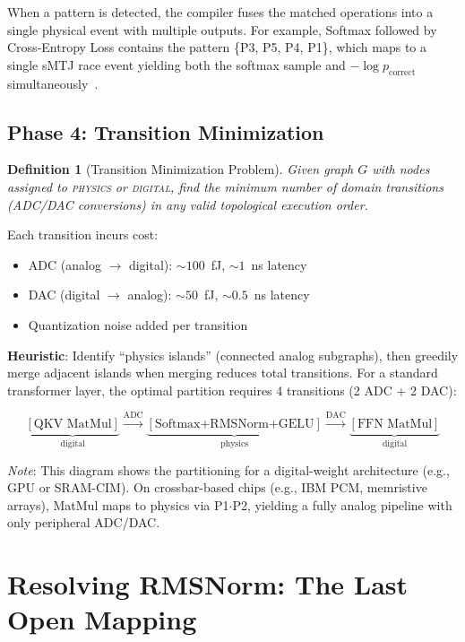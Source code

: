 \documentclass[11pt]{article}
\newtheorem{definition}{Definition}
\begin{document}
When a pattern is detected, the compiler fuses the matched operations into a single physical event with multiple outputs. For example, Softmax followed by Cross-Entropy Loss contains the pattern \{P3, P5, P4, P1\}, which maps to a single sMTJ race event yielding both the softmax sample and $-\log p_{\text{correct}}$ simultaneously~\cite{bieg2026}.

\subsection{Phase 4: Transition Minimization}

\begin{definition}[Transition Minimization Problem]
Given graph $G$ with nodes assigned to \textsc{physics} or \textsc{digital}, find the minimum number of domain transitions (ADC/DAC conversions) in any valid topological execution order.
\end{definition}

Each transition incurs cost:
\begin{itemize}[leftmargin=*]
\item ADC (analog $\to$ digital): ${\sim}100$~fJ, ${\sim}1$~ns latency
\item DAC (digital $\to$ analog): ${\sim}50$~fJ, ${\sim}0.5$~ns latency
\item Quantization noise added per transition
\end{itemize}

\textbf{Heuristic}: Identify ``physics islands'' (connected analog subgraphs), then greedily merge adjacent islands when merging reduces total transitions. For a standard transformer layer, the optimal partition requires 4 transitions (2 ADC + 2 DAC):

\begin{equation*}
\underbrace{[\text{QKV MatMul}]}_{\text{digital}} \!\xrightarrow{\text{ADC}}\! \underbrace{[\text{Softmax+RMSNorm+GELU}]}_{\text{physics}} \!\xrightarrow{\text{DAC}}\! \underbrace{[\text{FFN MatMul}]}_{\text{digital}}
\end{equation*}

\noindent\textit{Note}: This diagram shows the partitioning for a digital-weight architecture (e.g., GPU or SRAM-CIM). On crossbar-based chips (e.g., IBM PCM, memristive arrays), MatMul maps to physics via P1$\cdot$P2, yielding a fully analog pipeline with only peripheral ADC/DAC.

\section{Resolving RMSNorm: The Last Open Mapping}
\label{sec:rmsnorm}
\end{document}
